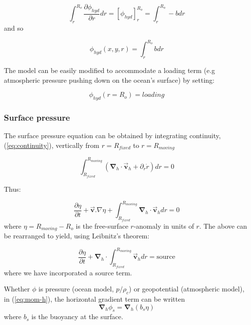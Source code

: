\begin{equation*}
\int_{r}^{R_{o}}\frac{\partial \phi _{hyd}}{\partial r}dr=\left[ \phi _{hyd}
\right] _{r}^{R_{o}}=\int_{r}^{R_{o}}-bdr
\end{equation*}
and so

\begin{equation}
\phi _{hyd}(x,y,r)=\int_{r}^{R_{o}}bdr  \label{eq:hydro-phi}
\end{equation}

The model can be easily modified to accommodate a loading term (e.g
atmospheric pressure pushing down on the ocean's surface) by setting:

\begin{equation}
\phi _{hyd}(r=R_{o})=loading  \label{eq:loading}
\end{equation}

\subsubsection{Surface pressure}

The surface pressure equation can be obtained by integrating continuity,
(\ref{eq:continuity}), vertically from $r=R_{fixed}$ to $r=R_{moving}$

\begin{equation*}
\int_{R_{fixed}}^{R_{moving}}\left( \mathbf{\nabla }_{h}\cdot \vec{\mathbf{v}
}_{h}+\partial _{r}\dot{r}\right) dr=0
\end{equation*}

Thus:

\begin{equation*}
\frac{\partial \eta }{\partial t}+\vec{\mathbf{v}}.\nabla \eta
+\int_{R_{fixed}}^{R_{moving}}\mathbf{\nabla }_{h}\cdot \vec{\mathbf{v}}
_{h}dr=0
\end{equation*}
where $\eta =R_{moving}-R_{o}$ is the free-surface $r$-anomaly in units of $
r $. The above can be rearranged to yield, using Leibnitz's theorem:

\begin{equation}
\frac{\partial \eta }{\partial t}+\mathbf{\nabla }_{h}\cdot
\int_{R_{fixed}}^{R_{moving}}\vec{\mathbf{v}}_{h}dr=\text{source}
\label{eq:free-surface}
\end{equation}
where we have incorporated a source term.

Whether $\phi $ is pressure (ocean model, $p/\rho _{c}$) or geopotential
(atmospheric model), in (\ref{eq:mom-h}), the horizontal gradient term can
be written 
\begin{equation}
\mathbf{\nabla }_{h}\phi _{s}=\mathbf{\nabla }_{h}\left( b_{s}\eta \right)
\label{eq:phi-surf}
\end{equation}
where $b_{s}$ is the buoyancy at the surface.

